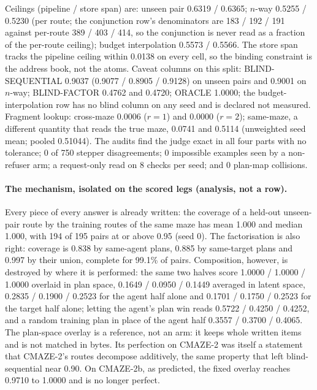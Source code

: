 \documentclass{article} %
\begin{document}
\noindent Ceilings (pipeline / store span) are: unseen pair 0.6319 / 0.6365; $n$-way 0.5255 / 0.5230
(per route; the conjunction row's denominators are 183 / 192 / 191 against per-route 389 / 403 /
414, so the conjunction is never read as a fraction of the per-route ceiling); budget interpolation
0.5573 / 0.5566. The store span tracks the pipeline ceiling within 0.0138 on every cell, so the
binding constraint is the address book, not the atoms. Caveat columns on this split:
BLIND-SEQUENTIAL 0.9037 (0.9077 / 0.8905 / 0.9128) on unseen pairs and 0.9001 on $n$-way;
BLIND-FACTOR 0.4762 and 0.4720; ORACLE 1.0000; the budget-interpolation row has no blind column on
any seed and is declared not measured. Fragment lookup: cross-maze 0.0006 ($r=1$) and 0.0000
($r=2$); same-maze, a different quantity that reads the true maze, 0.0741 and 0.5114 (unweighted
seed mean; pooled 0.51044). %
The audits find the judge exact in all four parts with no tolerance; 0 of 750 stepper
disagreements; 0 impossible examples seen by a non-refuser arm; a request-only read on 8 checks
per seed; and 0 plan-map collisions. %

\paragraph{The mechanism, isolated on the scored legs (analysis, not a row).} Every piece of every
answer is already written: the coverage of a held-out unseen-pair route by the training routes of
the same maze has mean 1.000 and median 1.000, with 194 of 195 pairs at or above 0.95 (seed 0). The
factorisation is also right: coverage is 0.838 by same-agent plans, 0.885 by same-target plans and
0.997 by their union, complete for 99.1\% of pairs. Composition, however, is destroyed by where it
is performed: the same two halves score 1.0000 / 1.0000 / 1.0000 overlaid in plan space,
0.1649 / 0.0950 / 0.1449 averaged in latent space, 0.2835 / 0.1900 / 0.2523 for the agent half alone
and 0.1701 / 0.1750 / 0.2523 for the target half alone; letting the agent's plan win reads 0.5722 / 0.4250 / 0.4252, and a random
training plan in place of the agent half 0.3557 / 0.3700 / 0.4065. %
The plan-space overlay is a reference, not an arm: it keeps whole written items and is not matched
in bytes. Its perfection on CMAZE-2 was itself a statement that CMAZE-2's routes decompose
additively, the same property that left blind-sequential near 0.90. On CMAZE-2b, as predicted, the
fixed overlay reaches 0.9710 to 1.0000 and is no longer perfect. %
\end{document}
